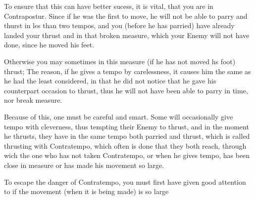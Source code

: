 
To ensure that this can have better sucess, it is vital, that you are
in Contrapostur. Since if he was the first to move, he will not be
able to parry and thurst in les than two tempos, and you (before he
has parried) have already landed your thrust and in that broken
measure, which your Enemy will not have done, since he moved his feet.


Otherwise you may sometimes in this measure (if he has not moved hs
foot) thrust; The reason, if he gives a tempo by carelessness, it
causes him the same as he had the least considered, in that he did not
notice that he gave his counterpart occasion to thrust, thus he will
not have been able to parry in time, nor break measure.


Because of this, one must be careful and smart. Some will occasionally
give tempo with cleverness, thus tempting their Enemy to thrust, and
in the moment he thrusts, they have in the same tempo both parried and
thrust, which is called thrusting with Contratempo, which often is
done that they both reach, through wich the one who has not taken
Contratempo, or when he gives tempo, has been close in measure or has
made his movement so large.  


To escape the danger of Contratempo, you must first have given good
attention to if the movement (when it is being made) is so large